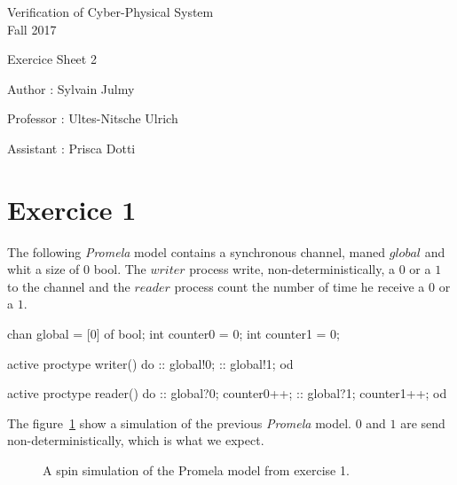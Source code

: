 \documentclass[a4paper,11pt]{report}
\author{Sylvain Julmy}
\date{\today}
\begin{document}
\begin{center}
\Large{
    Verification of Cyber-Physical System\\
    Fall 2017
  }
  
  \noindent\makebox[\linewidth]{\rule{\linewidth}{0.4pt}}
  Exercice Sheet 2

  \vspace*{1.4cm}

  Author : Sylvain Julmy
  \noindent\makebox[\linewidth]{\rule{\linewidth}{0.4pt}}

  \begin{flushleft}
    Professor : Ultes-Nitsche Ulrich
    
    Assistant : Prisca Dotti
  \end{flushleft}

  \noindent\makebox[\linewidth]{\rule{\textwidth}{1pt}}
\end{center}

\section*{Exercice 1}

The following \textit{Promela} model contains a synchronous channel, maned
$global$ and whit a size of $0$ {bool}. The $writer$ process write,
non-deterministically, a $0$ or a $1$ to the channel and the $reader$ process
count the number of time he receive a $0$ or a $1$.

\begin{promelacode}
chan global = [0] of {bool};
int counter0 = 0;
int counter1 = 0;

active proctype writer() {
    do
        :: global!0;
        :: global!1;
    od
}

active proctype reader() {
    do
        :: global?0; counter0++;
        :: global?1; counter1++;
    od
}
\end{promelacode}

The figure~\ref{fig:ex1_simulation} show a simulation of the previous \textit{Promela}
model. $0$ and $1$ are send non-deterministically, which is what we expect.

\begin{figure}[ht]
  \centering
  \caption{\label{fig:ex1_simulation}A spin simulation of the Promela model from exercise
  1.}
\end{figure}
\end{document}
